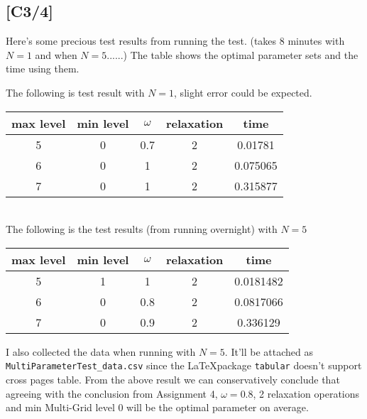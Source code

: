 \documentclass[12pt,a4paper]{article}
\begin{document}
\subsection*{[C3/4]}
Here's some precious test results from running the test. (takes 8 minutes with $N=1$ and when $N=5$......) The table shows the optimal parameter sets and the time using them. 
\begin{center}
The following is test result with $N=1$, slight error could be expected. \\
\begin{tabular}{|c|c|c|c|c|}
\hline
max level & min level & $\omega$ & relaxation & time \\
\hline
5 & 0 & 0.7 & 2 & 0.01781 \\
6 & 0 & 1 & 2 & 0.075065 \\
7 & 0 & 1 & 2 & 0.315877 \\
\hline
\end{tabular}\\
The following is the test results (from running overnight) with $N=5$\\
\begin{tabular}{|c|c|c|c|c|}
\hline
max level & min level & $\omega$ & relaxation & time \\
\hline
5 & 1 & 1 & 2 & 0.0181482\\
6 & 0 & 0.8 & 2 & 0.0817066\\
7 & 0 & 0.9 & 2 & 0.336129\\
\hline
\end{tabular}
\end{center}
I also collected the data when running with $N=5$. It'll be attached as \texttt{MultiParameterTest\_data.csv} since the \LaTeX package \texttt{tabular} doesn't support cross pages table.
From the above result we can conservatively conclude that agreeing with the conclusion from Assignment 4, $\omega = 0.8$, 2 relaxation operations and min Multi-Grid level 0 will be the optimal parameter on average. 
\end{document}
